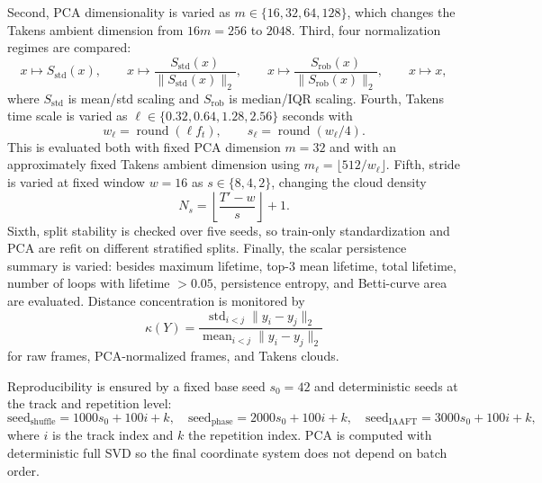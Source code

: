 Second, PCA dimensionality is varied as $m\in\{16,32,64,128\}$, which changes the Takens ambient dimension from $16m=256$ to $2048$. Third, four normalization regimes are compared:
\[
x\mapsto S_{\mathrm{std}}(x),\qquad
x\mapsto \frac{S_{\mathrm{std}}(x)}{\|S_{\mathrm{std}}(x)\|_2},\qquad
x\mapsto \frac{S_{\mathrm{rob}}(x)}{\|S_{\mathrm{rob}}(x)\|_2},\qquad
x\mapsto x,
\]
where $S_{\mathrm{std}}$ is mean/std scaling and $S_{\mathrm{rob}}$ is median/IQR scaling. Fourth, Takens time scale is varied as $\ell\in\{0.32,0.64,1.28,2.56\}$ seconds with
\[
w_\ell=\operatorname{round}(\ell f_t),\qquad
s_\ell=\operatorname{round}(w_\ell/4).
\]
This is evaluated both with fixed PCA dimension $m=32$ and with an approximately fixed Takens ambient dimension using $m_\ell=\lfloor 512/w_\ell\rfloor$. Fifth, stride is varied at fixed window $w=16$ as $s\in\{8,4,2\}$, changing the cloud density
\[
N_s=\left\lfloor\frac{T'-w}{s}\right\rfloor+1.
\]
Sixth, split stability is checked over five seeds, so train-only standardization and PCA are refit on different stratified splits. Finally, the scalar persistence summary is varied: besides maximum lifetime, top-3 mean lifetime, total lifetime, number of loops with lifetime $>0.05$, persistence entropy, and Betti-curve area are evaluated. Distance concentration is monitored by
\[
\kappa(Y)=
\frac{\operatorname{std}_{i<j}\|y_i-y_j\|_2}
{\operatorname{mean}_{i<j}\|y_i-y_j\|_2}
\]
for raw frames, PCA-normalized frames, and Takens clouds.

Reproducibility is ensured by a fixed base seed $s_0=42$ and deterministic seeds at the track and repetition level:
\begin{equation}\label{eq:seeds}
\text{seed}_{\text{shuffle}}=1000 s_0+100i+k,\quad
\text{seed}_{\text{phase}}=2000 s_0+100i+k,\quad
\text{seed}_{\text{IAAFT}}=3000 s_0+100i+k,
\end{equation}
where $i$ is the track index and $k$ the repetition index. PCA is computed with deterministic full SVD so the final coordinate system does not depend on batch order.
